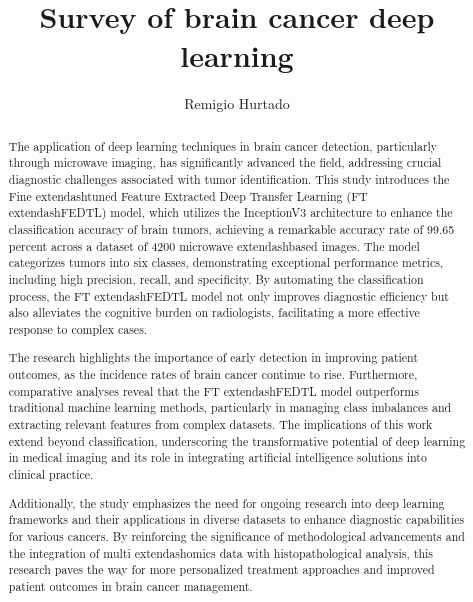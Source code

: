 \documentclass[runningheads]{llncs}
\begin{document}
%
\title{Survey of brain cancer deep learning}
%
%
\author{Remigio Hurtado}
%
%
%
\maketitle    
%
\begin{abstract}
The application of deep learning techniques in brain cancer detection, particularly through microwave imaging, has significantly advanced the field, addressing crucial diagnostic challenges associated with tumor identification. This study introduces the Fine	extendash{}tuned Feature Extracted Deep Transfer Learning (FT	extendash{}FEDTL) model, which utilizes the InceptionV3 architecture to enhance the classification accuracy of brain tumors, achieving a remarkable accuracy rate of 99.65 percent across a dataset of 4200 microwave	extendash{}based images. The model categorizes tumors into six classes, demonstrating exceptional performance metrics, including high precision, recall, and specificity. By automating the classification process, the FT	extendash{}FEDTL model not only improves diagnostic efficiency but also alleviates the cognitive burden on radiologists, facilitating a more effective response to complex cases.

The research highlights the importance of early detection in improving patient outcomes, as the incidence rates of brain cancer continue to rise. Furthermore, comparative analyses reveal that the FT	extendash{}FEDTL model outperforms traditional machine learning methods, particularly in managing class imbalances and extracting relevant features from complex datasets. The implications of this work extend beyond classification, underscoring the transformative potential of deep learning in medical imaging and its role in integrating artificial intelligence solutions into clinical practice.

Additionally, the study emphasizes the need for ongoing research into deep learning frameworks and their applications in diverse datasets to enhance diagnostic capabilities for various cancers. By reinforcing the significance of methodological advancements and the integration of multi	extendash{}omics data with histopathological analysis, this research paves the way for more personalized treatment approaches and improved patient outcomes in brain cancer management.
\end{abstract}
\end{document}
